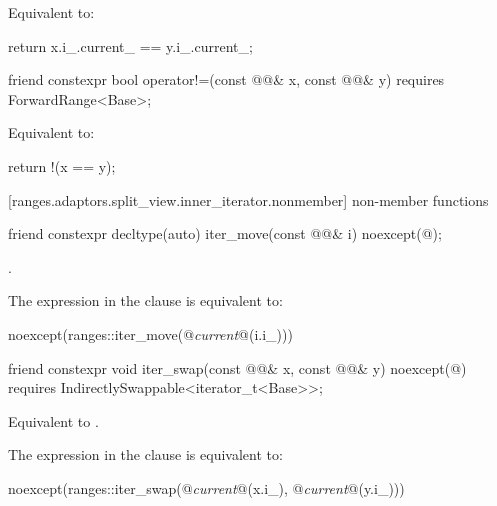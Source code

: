 \begin{itemdescr}
\pnum
\effects Equivalent to:
\begin{codeblock}
return x.i_.current_ == y.i_.current_;
\end{codeblock}
\end{itemdescr}

%
\begin{itemdecl}
friend constexpr bool operator!=(const @@& x, const @@& y)
  requires ForwardRange<Base>;
\end{itemdecl}

\begin{itemdescr}
\pnum
\effects Equivalent to:
\begin{codeblock}
return !(x == y);
\end{codeblock}
\end{itemdescr}

[ranges.adaptors.split_view.inner_iterator.nonmember]{ non-member functions}

%
\begin{itemdecl}
friend constexpr decltype(auto) iter_move(const @@& i)
noexcept(@\seebelow@);
\end{itemdecl}

\begin{itemdescr}
\pnum
\returns {}.

\pnum
\remarks The expression in the  clause is equivalent to:
\begin{codeblock}
noexcept(ranges::iter_move(@\textit{current}@(i.i_)))
\end{codeblock}
\end{itemdescr}

%
\begin{itemdecl}
friend constexpr void iter_swap(const @@& x, const @@& y)
noexcept(@\seebelow@) requires IndirectlySwappable<iterator_t<Base>>;
\end{itemdecl}

\begin{itemdescr}
\pnum
\effects Equivalent to .

\pnum
\remarks The expression in the  clause is equivalent to:
\begin{codeblock}
noexcept(ranges::iter_swap(@\textit{current}@(x.i_), @\textit{current}@(y.i_)))
\end{codeblock}
\end{itemdescr}

